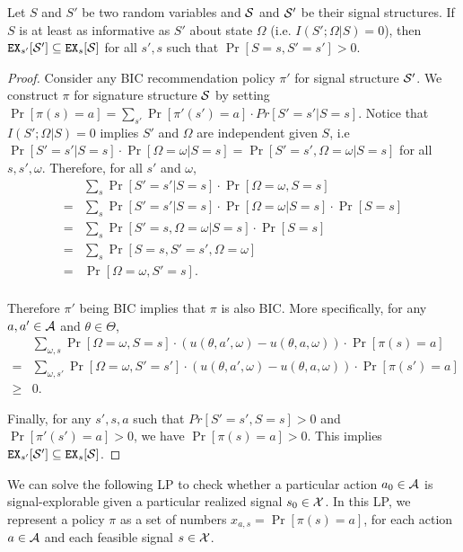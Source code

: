\begin{lemma}
\label{lem:infomono}
Let $S$ and $S'$ be two random variables and $\S$ and $\S'$ be their signal structures. If $S$ is at least as informative as $S'$ about state $\Omega$ (i.e. $I(S' ; \Omega|S) = 0$), then $\EX_{s'}[\S'] \subseteq \EX_s[\S]$ for all $s' ,s$ such that $\Pr[S= s, S'= s'] > 0$.
\end{lemma}

\begin{proof}
Consider any BIC recommendation policy $\pi'$ for signal structure $\S'$. We construct $\pi$ for signature structure $\S$ by setting $\Pr[\pi(s) = a] = \sum_{s'} \Pr[\pi'(s') = a] \cdot Pr[S' = s'|S = s]$. Notice that $I(S' ; \Omega|S) = 0$ implies $S'$ and $\Omega$ are independent given $S$, i.e $\Pr[S' = s'|S=s] \cdot \Pr[\Omega = \omega|S=s] = \Pr[S'=s', \Omega = \omega|S=s]$ for all $s,s',\omega$. Therefore, for all $s'$ and $\omega$,  
\begin{align*}
 &\sum_s \Pr[S' = s'|S = s] \cdot \Pr[\Omega = \omega, S= s] \\
=& \sum_s   \Pr[S' = s'|S=s] \cdot \Pr[\Omega = \omega|S=s] \cdot \Pr[S=s] \\
= &\sum_s \Pr[S'=s,\Omega =\omega|S=s] \cdot \Pr[S=s] \\
= &\sum_s \Pr[S=s,S'=s',\Omega =\omega] \\
= &\Pr[\Omega =\omega, S'=s].\\
\end{align*}

 Therefore $\pi'$ being BIC implies that $\pi$ is also BIC. More specifically, for any $a,a' \in \A$ and $\theta \in \varTheta$,  
\begin{align*}
&\sum_{\omega,s} \Pr[\Omega = \omega, S = s] \cdot (u(\theta,a', \omega) - u(\theta,a,\omega)) \cdot \Pr[\pi(s) = a] \\
=&\sum_{\omega,s'}\Pr[\Omega = \omega, S' = s'] \cdot (u(\theta,a', \omega) - u(\theta,a,\omega)) \cdot \Pr[\pi(s') = a] \\
\geq & 0.
\end{align*} 


Finally, for any $s', s ,a$ such that $Pr[S' = s',S = s] >0 $ and $\Pr[\pi'(s') = a] >0$, we have $\Pr[\pi(s) = a] > 0$. This implies $\EX_{s'}[\S'] \subseteq \EX_s[\S]$.
\end{proof}

We can solve the following LP to check whether a particular action $a_0 \in\A$ is signal-explorable given a particular realized signal $s_0\in\X$. In this LP, we represent a policy $\pi$ as a set of numbers
    $x_{a,s} = \Pr[\pi(s)=a]$,
for each action $a\in \A$ and each feasible signal $s\in \X$. 



